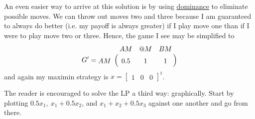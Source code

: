 \documentclass[11pt, oneside]{article}     %
\begin{document}
An even easier way to arrive at this solution is by using 
\href{http://en.wikipedia.org/wiki/Strategic_dominance}{\uline{dominance}}
to eliminate possible moves. We can throw out
moves two and three because I am guaranteed to always do better (i.e. my payoff
is always greater) if I play move one than if I were to play 
move two or three. Hence, the game I see may be simplified to
\begin{align*}
G' = \bordermatrix{
      &   AM & @M & BM\cr
      AM & 0.5 & 1 & 1}
\end{align*}
and again my maximin strategy is $x = \begin{bmatrix}1 & 0 & 0 \end{bmatrix}^t$.


The reader is encouraged to solve the LP a third way: graphically. Start by plotting 
$0.5x_1,~x_1 + 0.5x_2$, and $x_1 + x_2 + 0.5x_3$ against one another
and go from there.
\end{document}
